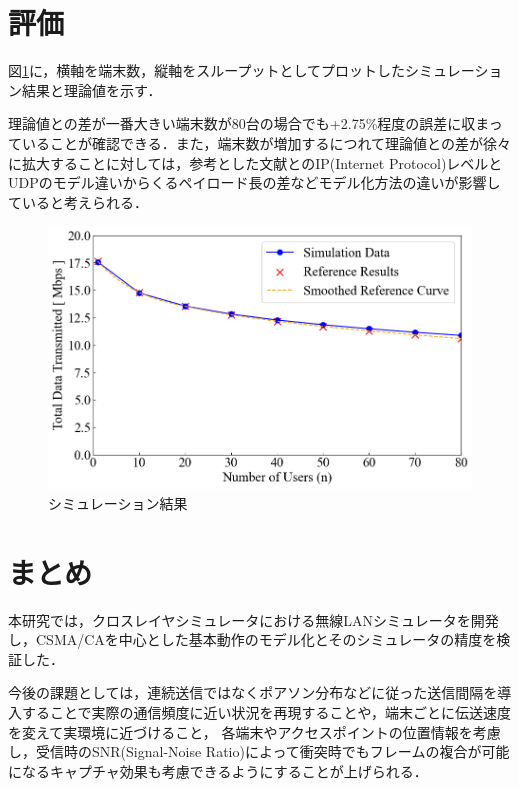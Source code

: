 \documentclass[a4paper, 10pt]{ltjsarticle}
\begin{document}
\section{評価}
図\ref{fig:simulation-result}に，横軸を端末数，縦軸をスループットとしてプロットしたシミュレーション結果と理論値を示す．



理論値との差が一番大きい端末数が80台の場合でも+2.75\%程度の誤差に収まっていることが確認できる．また，端末数が増加するにつれて理論値との差が徐々に拡大することに対しては，参考とした文献\cite{paper}とのIP(Internet Protocol)レベルとUDPのモデル違いからくるペイロード長の差などモデル化方法の違いが影響していると考えられる．

\begin{figure}[t]
  \centering
  \includegraphics[width=1\columnwidth]{./assets/g3.png}
  \caption{シミュレーション結果}
  \label{fig:simulation-result}
\end{figure}

\section{まとめ}
本研究では，クロスレイヤシミュレータにおける無線LANシミュレータを開発し，CSMA/CAを中心とした基本動作のモデル化とそのシミュレータの精度を検証した．

今後の課題としては，連続送信ではなくポアソン分布などに従った送信間隔を導入することで実際の通信頻度に近い状況を再現することや，端末ごとに伝送速度を変えて実環境に近づけること，
各端末やアクセスポイントの位置情報を考慮し，受信時のSNR(Signal-Noise Ratio)によって衝突時でもフレームの複合が可能になるキャプチャ効果も考慮できるようにすることが上げられる．


\end{document}
